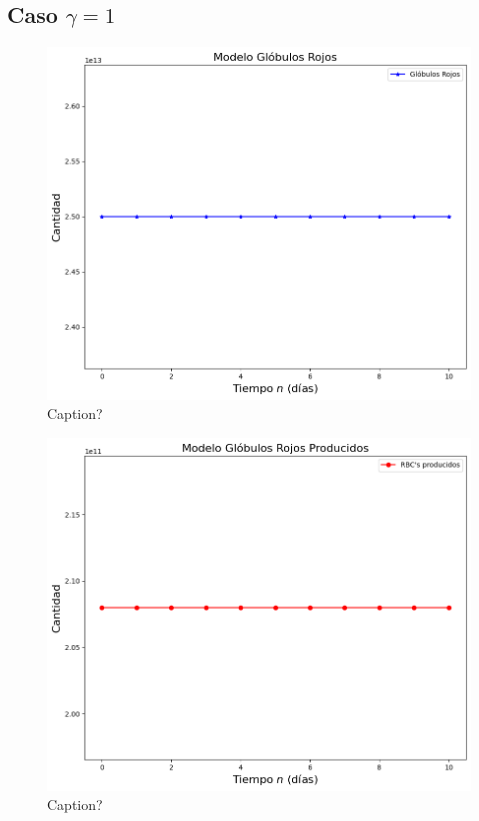 \subsection{Caso $\gamma=1$}
\begin{figure}[H]
    \centering
    \includegraphics[scale=0.55]{figures/BaseG1RBC.png}
    \caption{Caption?}
    \label{sec:modelo:fig:G1RBC}
\end{figure}

\begin{figure}[H]
    \centering
    \includegraphics[scale=0.55]{figures/BaseG1SC.png}
    \caption{Caption?}
    \label{sec:modelo:fig:G1SC}
\end{figure}


